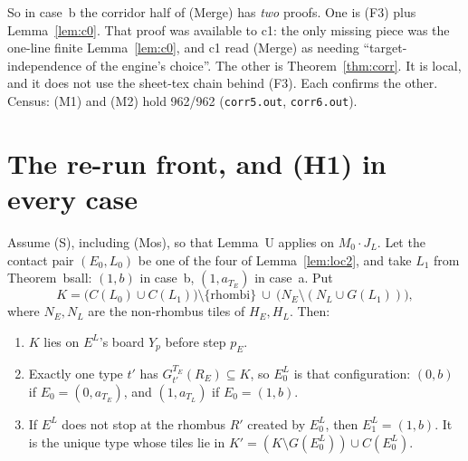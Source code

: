 \documentclass[11pt]{article}
\theoremstyle{definition}\newtheorem{definition}[theorem]{Definition}\newtheorem{remark}[theorem]{Remark}
\begin{document}
\noindent So in case~b the corridor half of (Merge) has \emph{two} proofs. One is (F3) plus Lemma~\ref{lem:c0}. That proof was available to c1: the only missing piece was the one-line finite Lemma~\ref{lem:c0}, and c1 read (Merge) as needing ``target-independence of the engine's choice''. The other is Theorem~\ref{thm:corr}. It is local, and it does not use the sheet-tex chain behind (F3). Each confirms the other. Census: (M1) and (M2) hold 962/962 (\texttt{corr5.out}, \texttt{corr6.out}).

\section{The re-run front, and (H1) in every case}\label{sec:rerun}
\begin{proposition}\label{prop:rerun}
Assume (S), including (Mos), so that Lemma~U applies on $M_0\cdot J_L$. Let the contact pair $(E_0,L_0)$ be one of the four of Lemma~\ref{lem:loc2}, and take $L_1$ from Theorem~bsall: $(1,b)$ in case~b, $(1,a_{T_E})$ in case~a. Put
\[K=\bigl(C(L_0)\cup C(L_1)\bigr)\setminus\{\text{rhombi}\}\ \cup\ \bigl(N_E\setminus(N_L\cup G(L_1))\bigr),\]
where $N_E,N_L$ are the non-rhombus tiles of $H_E,H_L$. Then:
\begin{enumerate}
\item $K$ lies on $E^L$'s board $Y_p$ before step $p_E$.
\item Exactly one type $t'$ has $G^{T_E}_{t'}(R_E)\subseteq K$, so $E^L_0$ is that configuration: $(0,b)$ if $E_0=(0,a_{T_E})$, and $(1,a_{T_L})$ if $E_0=(1,b)$.
\item If $E^L$ does not stop at the rhombus $R'$ created by $E^L_0$, then $E^L_1=(1,b)$. It is the unique type whose tiles lie in $K'=(K\setminus G(E^L_0))\cup C(E^L_0)$.
\end{enumerate}
\end{proposition}
\end{document}

